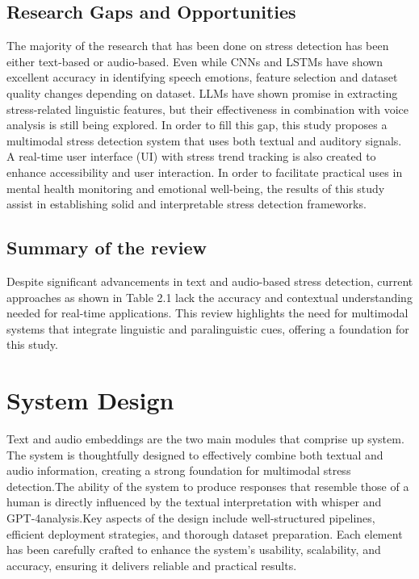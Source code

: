 \documentclass[Arial,12pt,openright,twoside]{book}
\begin{document}
  \section{Research Gaps and Opportunities}
The majority of the research that has been done on stress detection has been either text-based or audio-based. Even while CNNs and LSTMs have shown excellent accuracy in identifying speech emotions, feature selection and dataset quality changes depending on dataset. LLMs have shown promise in extracting stress-related linguistic features, but their effectiveness in combination with voice analysis is still being explored. In order to fill this gap, this study proposes a multimodal stress detection system that uses both textual and auditory signals. A real-time user interface (UI) with stress trend tracking is also created to enhance accessibility and user interaction. In order to facilitate practical uses in mental health monitoring and emotional well-being, the results of this study assist in establishing solid and interpretable stress detection frameworks.
\section{Summary of the review}
Despite significant advancements in text and audio-based stress detection, current approaches as shown in Table 2.1 lack the accuracy and contextual understanding needed for real-time applications. This review highlights the need for multimodal systems that integrate linguistic and paralinguistic cues, offering a foundation for this study.
\chapter{System Design}
\clearpage 
Text and audio embeddings are the two main modules that comprise up system. The system is thoughtfully designed to effectively combine both textual and audio information, creating a strong foundation for multimodal stress detection.The ability of the system to produce responses that resemble those of a human is directly influenced by the textual interpretation with whisper and GPT-4analysis.Key aspects of the design include well-structured pipelines, efficient deployment strategies, and thorough dataset preparation. Each element has been carefully crafted to enhance the system's usability, scalability, and accuracy, ensuring it delivers reliable and practical results.
\end{document}
